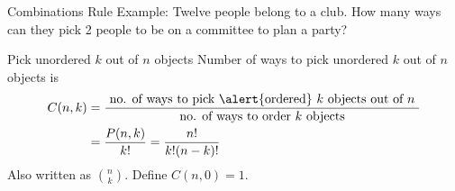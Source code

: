 \documentclass{beamer}
\newcommand{\ignore}[1]{}
\begin{document}
\begin{frame}{Combinations Rule}
Example: Twelve people belong to a club. How many ways can they pick 2 people to be on a committee to plan a party? 

\begin{block}{Pick unordered $k$ out of $n$ objects}
Number of ways to pick \alert{unordered} $k$  out of $n$  objects is
\begin{align*}
C(n,k)&=\frac{\text{ no. of ways to pick \alert{ordered} $k$ objects out of $n$  }}
{\text{no. of ways to order $k$ objects}}\\
& = \frac{P(n,k)}{k!} = \frac{n!}{k!(n-k)!}
\end{align*}
Also written as $\binom{n}{k}$. Define $C(n,0)=1$.
\end{block}


\ignore{    Number of different samples of containing $k$ elements that can be selected from $n$ elements:
    $$C(n,k) = \frac{n!}{k!(n-k)!}.$$
    \begin{itemize}
    \item Also written as $\binom{n}{k}$.
        \item Define $C(n,0)=1$.
        \item $C(n,k) = C(n,n-k)$.
    \end{itemize}
    }
\end{frame}
\end{document}
